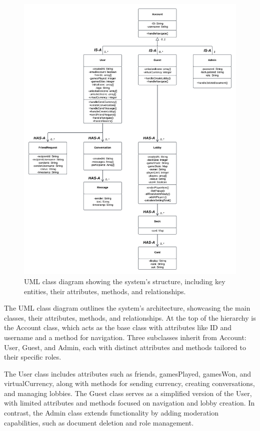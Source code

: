 \begin{figure}[H]
    \centering
    \includegraphics[width=1\linewidth]{CS482 Sequence Diagram Sprint 3.png}
    \caption{UML class diagram showing the system's structure, including key entities, their attributes, methods, and relationships.}
    \label{fig:umlclass}
\end{figure}
\vspace{-1em}
\noindent The UML class diagram outlines the system's architecture, showcasing the main classes, their attributes, methods, and relationships. At the top of the hierarchy is the Account class, which acts as the base class with attributes like ID and username and a method for navigation. Three subclasses inherit from Account: User, Guest, and Admin, each with distinct attributes and methods tailored to their specific roles.

\noindent The User class includes attributes such as friends, gamesPlayed, gamesWon, and virtualCurrency, along with methods for sending currency, creating conversations, and managing lobbies. The Guest class serves as a simplified version of the User, with limited attributes and methods focused on navigation and lobby creation. In contrast, the Admin class extends functionality by adding moderation capabilities, such as document deletion and role management.

